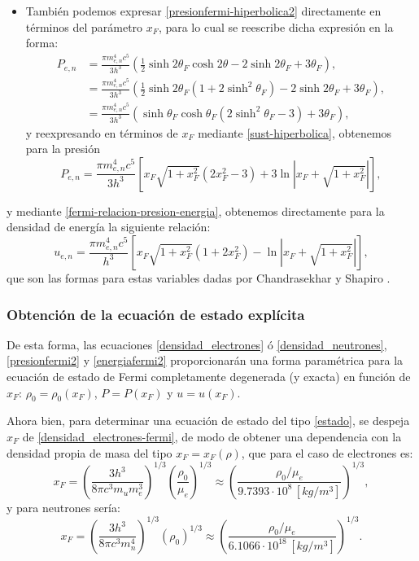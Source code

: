 \begin{itemize}
\item También podemos expresar \eqref{presionfermi-hiperbolica2} directamente en términos del parámetro $x_F$, para lo cual se reescribe dicha expresión en la forma:
\begin{align}
P_{e,n}&=\frac{\pi m_{e,n}^4c^5}{3h^3}\left(\frac{1}{2}\sinh2\theta_F\cosh2\theta-2\sinh2\theta_F+3\theta_F\right),\\
&=\frac{\pi m_{e,n}^4c^5}{3h^3}\left(\frac{1}{2}\sinh2\theta_F\left(1+2\sinh^2\theta_F\right)-2\sinh2\theta_F+3\theta_F\right),\\
&=\frac{\pi m_{e,n}^4c^5}{3h^3}\left(\sinh\theta_F\cosh\theta_F\left(2\sinh^2\theta_F-3\right)+3\theta_F\right),
\end{align}
y reexpresando en términos de $x_F$ mediante \eqref{sust-hiperbolica}, obtenemos para la presión
\begin{equation}\label{presionfermi2}
\boxed{ P_{e,n}=\frac{\pi m_{e,n}^4c^5}{3h^3}\left[x_F\sqrt{1+x_F^2}\left(2x_F^2-3\right)+3\ln\left|x_F+\sqrt{1+x_F^2}\right|\right],}
\end{equation}
\end{itemize}
y mediante \eqref{fermi-relacion-presion-energia}, obtenemos directamente para la densidad de energía la siguiente relación:
\begin{equation}\label{energiafermi2}
 \boxed{u_{e,n}=\frac{\pi m_{e,n}^4c^5}{h^3}\left[x_F\sqrt{1+x_F^2}\left(1+2x_F^2\right)-\ln\left|x_F+\sqrt{1+x_F^2}\right|\right],}
\end{equation}
que son las formas para estas variables dadas por Chandrasekhar \cite{Chandra39} y Shapiro \cite{Shapiro83}.


\subsubsection{Obtención de la ecuación de estado explícita}

De esta forma, las ecuaciones \eqref{densidad_electrones} ó \eqref{densidad_neutrones}, \eqref{presionfermi2} y \eqref{energiafermi2} proporcionarán una forma paramétrica para la ecuación de estado de Fermi completamente degenerada (y exacta) en función de $x_F$: $\rho_0=\rho_0(x_F)$, $P=P(x_F)$ y $u=u(x_F)$.

Ahora bien, para determinar una ecuación de estado del tipo \eqref{estado}, se despeja $x_F$ de \eqref{densidad_electrones-fermi}, de modo de obtener una dependencia con la densidad propia de masa del tipo $x_F=x_F(\rho)$, que para el caso de electrones es:
\begin{equation}\label{xrelativo_electrones}
 x_F=\left(\frac{3h^3}{8\pi c^3 m_u m_e^3}\right)^{1/3}\left(\frac{\rho_0}{\mu_e}\right)^{1/3}\approx\left(\frac{\rho_0/\mu_e}{9.7393\cdot10^8\,[kg/m^3]}\right)^{1/3},
\end{equation}
y para neutrones sería:
\begin{equation}\label{xrelativo_neutrones}
 x_F=\left(\frac{3h^3}{8\pi c^3 m_n^4}\right)^{1/3}\left(\rho_0\right)^{1/3}\approx\left(\frac{\rho_0/\mu_e}{6.1066\cdot10^{18}\,[kg/m^3]}\right)^{1/3}.
\end{equation}

